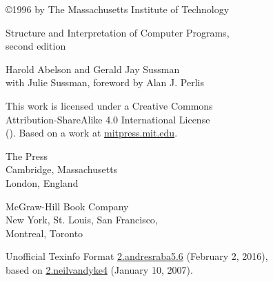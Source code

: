 \vspace*{\fill}
\thispagestyle{empty}

\begin{small}
\begin{center}

\noindent
{\copyright}1996 by The Massachusetts Institute of Technology

\vspace{1.26em}
\noindent
Structure and Interpretation of Computer Programs,\\
second edition

\vspace{1.26em}
\noindent
Harold Abelson and Gerald Jay Sussman\\
with Julie Sussman, foreword by Alan J. Perlis

\vspace{1.6em}
\noindent




\vspace{0.4em}
\noindent
This work is licensed under a Creative Commons\\
Attribution-ShareAlike 4.0 International License\\
(\href{http://creativecommons.org/licenses/by-sa/4.0/}{}).
Based on a work at \href{http://mitpress.mit.edu/sicp/}{mitpress.mit.edu}.

\vspace{1.26em}
\noindent
The  Press\\
Cambridge, Massachusetts\\
London, England

\vspace{1.26em}
\noindent
McGraw-Hill Book Company\\
New York, St. Louis, San Francisco,\\
Montreal, Toronto

\vspace{1.26em}
\noindent
Unofficial Texinfo Format \href{http://sicpebook.wordpress.com}{2.andresraba5.6} (February 2, 2016),\\
based on \href{http://www.neilvandyke.org/sicp-texi/}{2.neilvandyke4} (January 10, 2007).

\end{center}
\end{small}

\pagebreak
